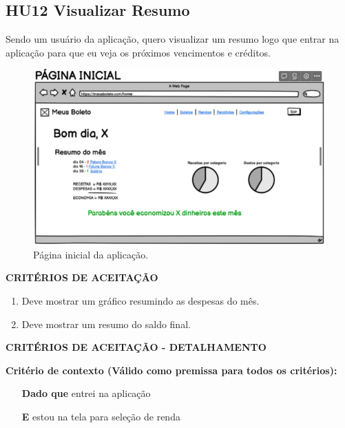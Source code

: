\subsection{HU12 Visualizar Resumo}

Sendo um usuário da aplicação, quero visualizar um resumo logo que entrar na aplicação para que eu veja os próximos vencimentos e créditos.

\begin{figure}[htb]
	\caption{\label{fig:Fig_1}Página inicial da aplicação.}
	\begin{center}
		\includegraphics[scale=0.5]{images/TelaInicial.png}
	\end{center}
\end{figure}

\textbf{CRITÉRIOS DE ACEITAÇÃO}

\begin{enumerate}
    \item Deve mostrar um gráfico resumindo as despesas do mês.
    \item Deve mostrar um resumo do saldo final.
\end{enumerate}

\textbf{CRITÉRIOS DE ACEITAÇÃO - DETALHAMENTO}

\textbf{Critério de contexto (Válido como premissa para todos os critérios):}

\begin{itemize}
    \item[\textbf{Dado que}] entrei na aplicação
    \item[\textbf{E}] estou na tela para seleção de renda
\end{itemize}


